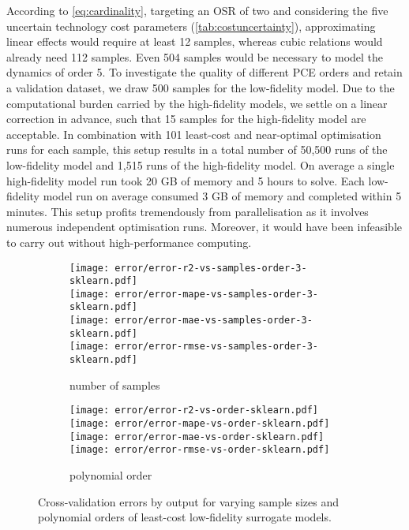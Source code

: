 According to \cref{eq:cardinality}, targeting an OSR of two
and considering the five uncertain technology cost parameters (\cref{tab:costuncertainty}),
approximating linear effects would require at least 12 samples, whereas cubic relations
would already need 112 samples. Even 504 samples would be necessary to model the dynamics of order 5.
To investigate the quality of different PCE orders
and retain a validation dataset,
we draw 500 samples for the low-fidelity model.
Due to the computational burden carried by the high-fidelity models,
we settle on a linear correction in advance, such that
15 samples for the high-fidelity model are acceptable.
In combination with 101 least-cost and near-optimal optimisation
runs for each sample, this setup results in a total number of
50,500 runs of the low-fidelity model and
1,515 runs of the high-fidelity model.
On average a single high-fidelity model run took 20 GB of memory and 5 hours to solve.
Each low-fidelity model run on average consumed 3 GB of memory and completed within 5 minutes.
This setup profits tremendously from parallelisation as it involves
numerous independent optimisation runs.
Moreover, it would have been infeasible to carry out without high-performance computing.


\begin{figure}
        \begin{subfigure}[t]{.48\textwidth}
            \centering
            \caption{number of samples}
            \label{fig:error:samples}
            \texttt{[image: error/error-r2-vs-samples-order-3-sklearn.pdf]} \\
            \texttt{[image: error/error-mape-vs-samples-order-3-sklearn.pdf]} \\
            \texttt{[image: error/error-mae-vs-samples-order-3-sklearn.pdf]} \\
            \texttt{[image: error/error-rmse-vs-samples-order-3-sklearn.pdf]}
        \end{subfigure}
        \begin{subfigure}[t]{.48\textwidth}
            \centering
            \caption{polynomial order}
            \label{fig:error:poly}
            \texttt{[image: error/error-r2-vs-order-sklearn.pdf]} \\
            \texttt{[image: error/error-mape-vs-order-sklearn.pdf]} \\
            \texttt{[image: error/error-mae-vs-order-sklearn.pdf]} \\
            \texttt{[image: error/error-rmse-vs-order-sklearn.pdf]}
        \end{subfigure}
    \caption[Cross-validation errors]{Cross-validation errors by output for varying sample sizes and polynomial orders
    of least-cost low-fidelity surrogate models.}
    \label{fig:error}
\end{figure}

